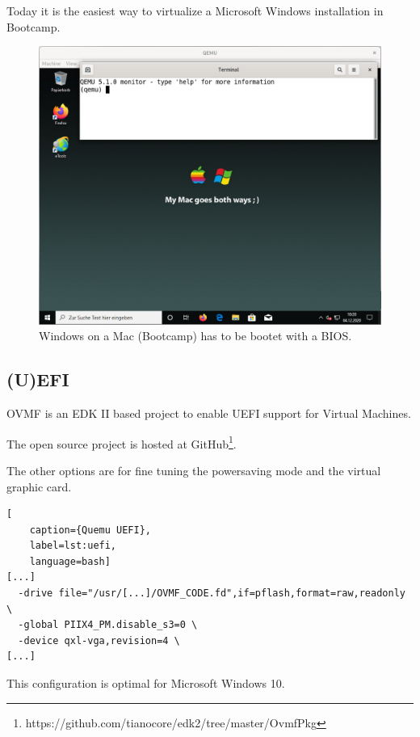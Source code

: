 Today it is the easiest way to virtualize a Microsoft Windows installation in Bootcamp.

\begin{figure}[htbp]  %
  \centering
  \includegraphics[width=.75\textwidth]{figures/boot-bios-BOOTCAMP.png}
  \caption[Qemu BIOS]{Windows on a Mac (Bootcamp) has to be bootet with a BIOS.}
  \label{fig:bios}
\end{figure}

\subsection{(U)EFI}

OVMF is an EDK II based project to enable UEFI support for Virtual Machines.

The open source project is hosted at GitHub\footnote{https://github.com/tianocore/edk2/tree/master/OvmfPkg}.

The other options are for fine tuning the powersaving mode and the virtual graphic card.

\begin{lstlisting}[
    caption={Quemu UEFI},
    label=lst:uefi,
    language=bash]
[...]
  -drive file="/usr/[...]/OVMF_CODE.fd",if=pflash,format=raw,readonly \
  -global PIIX4_PM.disable_s3=0 \
  -device qxl-vga,revision=4 \
[...]
\end{lstlisting}

This configuration is optimal for Microsoft Windows 10.

